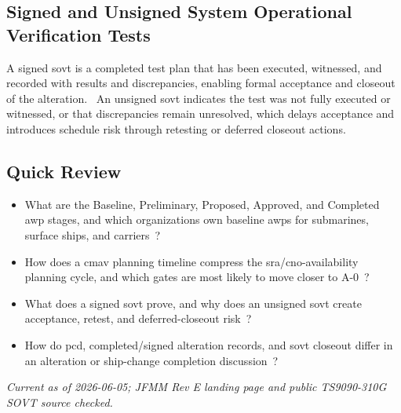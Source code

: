 \documentclass[../main.tex]{subfiles}
\begin{document}
\subsection{Signed and Unsigned System Operational Verification Tests}
A signed \ac{sovt} is a completed test plan that has been executed, witnessed, and recorded with results and discrepancies, enabling formal acceptance and closeout of the alteration.~\autocite{TS9090-310} An unsigned \ac{sovt} indicates the test was not fully executed or witnessed, or that discrepancies remain unresolved, which delays acceptance and introduces schedule risk through retesting or deferred closeout actions.~\autocite{TS9090-310}

\subsection{Quick Review}
\begin{itemize}
  \item What are the Baseline, Preliminary, Proposed, Approved, and Completed \ac{awp} stages, and which organizations own baseline \acp{awp} for submarines, surface ships, and carriers~\autocite{COMFLTFORCOMINST4790-3,edo-4-2-1-cno-availability-planning-2025}?
  \item How does a \ac{cmav} planning timeline compress the \ac{sra}/\ac{cno}-availability planning cycle, and which gates are most likely to move closer to A-0~\autocite{COMFLTFORCOMINST4790-3,edo-4-2-1-cno-availability-planning-2025,edo-4-2-2-cno-availability-execution-2025}?
  \item What does a signed \ac{sovt} prove, and why does an unsigned \ac{sovt} create acceptance, retest, and deferred-closeout risk~\autocite{TS9090-310}?
  \item How do \ac{pcd}, completed/signed alteration records, and \ac{sovt} closeout differ in an alteration or ship-change completion discussion~\autocite{TS9090-310}?
\end{itemize}

\noindent\textit{Current as of 2026-06-05; JFMM Rev E landing page and public TS9090-310G SOVT source checked.}

\end{document}
